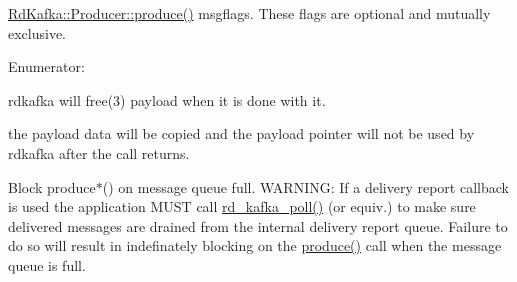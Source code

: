 \hyperlink{classRdKafka_1_1Producer_ab90a30c5e5fb006a3b4004dc4c9a7923}{RdKafka::Producer::produce()} {\ttfamily msgflags}. These flags are optional and mutually exclusive. \begin{Desc}
\item[Enumerator: ]\par
\begin{description}
\item[{\em 
\hypertarget{classRdKafka_1_1Producer_abe5e3437f8db2600f10a8daa429ab242a1aaa1620d84d2fa797d05a5bfcefd31e}{
RK\_\-MSG\_\-FREE}
\label{classRdKafka_1_1Producer_abe5e3437f8db2600f10a8daa429ab242a1aaa1620d84d2fa797d05a5bfcefd31e}
}]rdkafka will free(3) {\ttfamily payload} when it is done with it. \item[{\em 
\hypertarget{classRdKafka_1_1Producer_abe5e3437f8db2600f10a8daa429ab242aa88d8865f6dcffe75f73536fdf2424a5}{
RK\_\-MSG\_\-COPY}
\label{classRdKafka_1_1Producer_abe5e3437f8db2600f10a8daa429ab242aa88d8865f6dcffe75f73536fdf2424a5}
}]the {\ttfamily payload} data will be copied and the {\ttfamily payload} pointer will not be used by rdkafka after the call returns. \item[{\em 
\hypertarget{classRdKafka_1_1Producer_abe5e3437f8db2600f10a8daa429ab242a6f05ff968fdf3375508238e192e1c03b}{
RK\_\-MSG\_\-BLOCK}
\label{classRdKafka_1_1Producer_abe5e3437f8db2600f10a8daa429ab242a6f05ff968fdf3375508238e192e1c03b}
}]Block produce$\ast$() on message queue full. WARNING: If a delivery report callback is used the application MUST call \hyperlink{rdkafka_8h_ad50c431e3a29d14da534db49bd0682a4}{rd\_\-kafka\_\-poll()} (or equiv.) to make sure delivered messages are drained from the internal delivery report queue. Failure to do so will result in indefinately blocking on the \hyperlink{classRdKafka_1_1Producer_ab90a30c5e5fb006a3b4004dc4c9a7923}{produce()} call when the message queue is full. \end{description}
\end{Desc}



